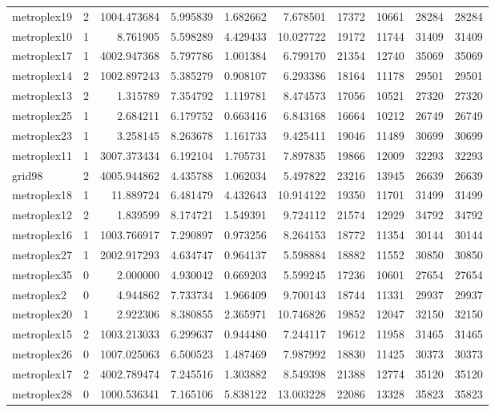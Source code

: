 \begin{longtable}{|l|r|r|r|r|r|r|r|r|r|}
metroplex19 & 2 & 1004.473684 & 5.995839 & 1.682662 & 7.678501 & 17372 & 10661 & 28284 & 28284 \\
metroplex10 & 1 & 8.761905 & 5.598289 & 4.429433 & 10.027722 & 19172 & 11744 & 31409 & 31409 \\
metroplex17 & 1 & 4002.947368 & 5.797786 & 1.001384 & 6.799170 & 21354 & 12740 & 35069 & 35069 \\
metroplex14 & 2 & 1002.897243 & 5.385279 & 0.908107 & 6.293386 & 18164 & 11178 & 29501 & 29501 \\
metroplex13 & 2 & 1.315789 & 7.354792 & 1.119781 & 8.474573 & 17056 & 10521 & 27320 & 27320 \\
metroplex25 & 1 & 2.684211 & 6.179752 & 0.663416 & 6.843168 & 16664 & 10212 & 26749 & 26749 \\
metroplex23 & 1 & 3.258145 & 8.263678 & 1.161733 & 9.425411 & 19046 & 11489 & 30699 & 30699 \\
metroplex11 & 1 & 3007.373434 & 6.192104 & 1.705731 & 7.897835 & 19866 & 12009 & 32293 & 32293 \\
grid98 & 2 & 4005.944862 & 4.435788 & 1.062034 & 5.497822 & 23216 & 13945 & 26639 & 26639 \\
metroplex18 & 1 & 11.889724 & 6.481479 & 4.432643 & 10.914122 & 19350 & 11701 & 31499 & 31499 \\
metroplex12 & 2 & 1.839599 & 8.174721 & 1.549391 & 9.724112 & 21574 & 12929 & 34792 & 34792 \\
metroplex16 & 1 & 1003.766917 & 7.290897 & 0.973256 & 8.264153 & 18772 & 11354 & 30144 & 30144 \\
metroplex27 & 1 & 2002.917293 & 4.634747 & 0.964137 & 5.598884 & 18882 & 11552 & 30850 & 30850 \\
metroplex35 & 0 & 2.000000 & 4.930042 & 0.669203 & 5.599245 & 17236 & 10601 & 27654 & 27654 \\
metroplex2 & 0 & 4.944862 & 7.733734 & 1.966409 & 9.700143 & 18744 & 11331 & 29937 & 29937 \\
metroplex20 & 1 & 2.922306 & 8.380855 & 2.365971 & 10.746826 & 19852 & 12047 & 32150 & 32150 \\
metroplex15 & 2 & 1003.213033 & 6.299637 & 0.944480 & 7.244117 & 19612 & 11958 & 31465 & 31465 \\
metroplex26 & 0 & 1007.025063 & 6.500523 & 1.487469 & 7.987992 & 18830 & 11425 & 30373 & 30373 \\
metroplex17 & 2 & 4002.789474 & 7.245516 & 1.303882 & 8.549398 & 21388 & 12774 & 35120 & 35120 \\
metroplex28 & 0 & 1000.536341 & 7.165106 & 5.838122 & 13.003228 & 22086 & 13328 & 35823 & 35823 \\

\end{longtable}
